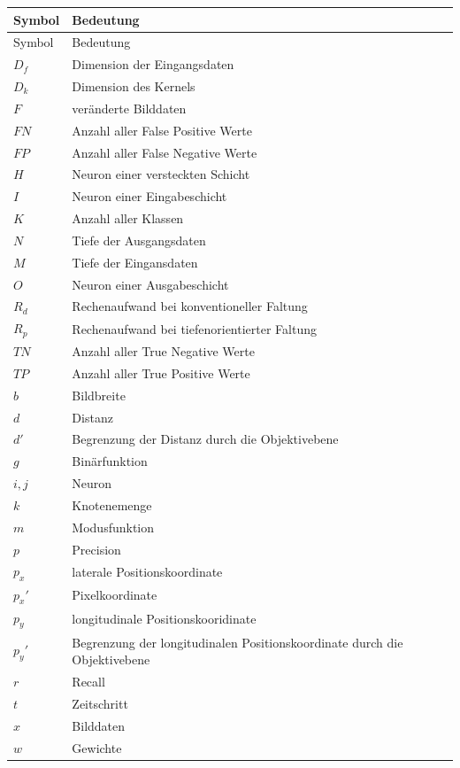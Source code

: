\documentclass[12pt,a4paper,oneside,numbers=noenddot,headsepline,captions=tableheading,toc=bibliography,openany,tikz,margin=5mm]{scrbook}
\begin{document}
	\begin{longtable}{p{3cm}p{8cm}}
		\setlength\tabcolsep{9pt}
		Symbol & Bedeutung \\ \hline
		\endfirsthead
		Symbol & Bedeutung \\ \hline
		
		\endhead
		\toprule 
		$D_f$&Dimension der Eingangsdaten\\
		$D_k$&Dimension des Kernels\\
		$F$&veränderte Bilddaten\\
		$FN$&Anzahl aller False Positive Werte\\
		$FP$&Anzahl aller False Negative Werte\\
		$H$&Neuron einer versteckten Schicht\\
		$I$&Neuron einer Eingabeschicht\\
		$K$&Anzahl aller Klassen\\
		$N$&Tiefe der Ausgangsdaten\\
		$M$&Tiefe der Eingansdaten\\
		$O$&Neuron einer Ausgabeschicht\\
		$R_d$&Rechenaufwand bei konventioneller Faltung\\
		$R_p$&Rechenaufwand bei tiefenorientierter Faltung\\
		$TN$&Anzahl aller True Negative Werte\\
		$TP$&Anzahl aller True Positive Werte\\
		
		$b$&Bildbreite\\
		$d$&Distanz\\
		$d'$&Begrenzung der Distanz durch die Objektivebene\\
		$g$&Binärfunktion\\
		$i, j$&Neuron\\
		$k$&Knotenemenge\\
		$m$&Modusfunktion\\
		$p$&Precision\\
		$p_x$&laterale Positionskoordinate\\
		$p_x'$&Pixelkoordinate\\
		$p_y$&longitudinale Positionskooridinate\\
		$p_y'$&Begrenzung der longitudinalen Positionskoordinate durch die Objektivebene\\
		$r$&Recall\\
		$t$&Zeitschritt\\
		$x$&Bilddaten\\
		$w$&Gewichte	\\ 
		

\end{longtable}
\end{document}
